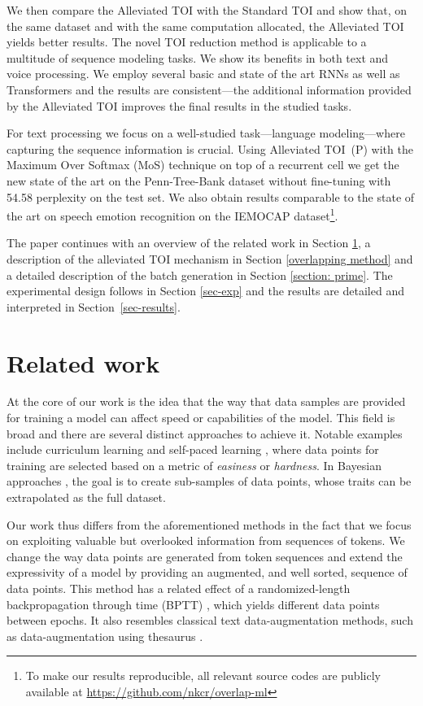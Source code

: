 \documentclass[11pt,a4paper]{article}
\begin{document}
We then compare the Alleviated TOI with the Standard TOI and show that, on the same dataset and with the same computation allocated, the Alleviated TOI yields better results. The novel TOI reduction method is applicable to a multitude of sequence modeling tasks. We show its benefits in both text and voice processing. We employ several basic and state of the art RNNs as well as Transformers and the results are consistent---the additional information provided by the Alleviated TOI improves the final results in the studied tasks.

For text processing we focus on a well-studied task---language modeling---where capturing the sequence information is crucial. Using Alleviated TOI~(P) with the Maximum Over Softmax (MoS) technique on top of a recurrent cell \cite{Zhilin:17} we get the new state of the art on the Penn-Tree-Bank dataset without fine-tuning with 54.58 perplexity on the test set. We also obtain results comparable to the state of the art on speech emotion recognition on the IEMOCAP \cite{Busso2008IEMOCAPIE} dataset\footnote{To make our results reproducible, all relevant source codes are publicly available at \url{https://github.com/nkcr/overlap-ml}}.

The paper continues with an overview of the related work in Section \ref{sec-related}, a description of the alleviated TOI mechanism in Section \ref{overlapping method} and a detailed description of the batch generation in Section \ref{section: prime}. The experimental design follows in Section \ref{sec-exp} and the results are detailed and interpreted in Section~\ref{sec-results}.


\section{Related work}
\label{sec-related}

At the core of our work is the idea that the way that data samples are provided for training a model can affect speed or capabilities of the model. 
This field is broad and there are several distinct approaches to achieve it. Notable examples include curriculum learning \cite{bengio:09}
and self-paced learning \cite{kumar:10}, where data points for training are selected based on a metric of \textit{easiness} or \textit{hardness}.
In Bayesian approaches \cite{KleinFBHH:16}, the goal is to create sub-samples of data points, whose traits can be extrapolated as the full dataset.

Our work thus differs from the aforementioned methods in the fact that we focus on exploiting valuable but overlooked information from sequences of tokens. 
We change the way data points are generated from token sequences and extend the expressivity of a model by providing an augmented, and well sorted, sequence of data points. This method has a related effect of a randomized-length backpropagation through time (BPTT) \cite{Merity:17}, which yields different data points between epochs. It also resembles classical text data-augmentation methods, such as data-augmentation using thesaurus \cite{zhang:2015text}. 
\end{document}
